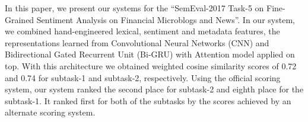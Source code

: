In this paper, we present our systems for the ``SemEval-2017 Task-5 on Fine- Grained Sentiment Analysis on Financial Microblogs and News''. In our system, we combined hand-engineered lexical, sentiment and metadata features, the representations learned from Convolutional Neural Networks (CNN) and Bidirectional Gated Recurrent Unit (Bi-GRU) with Attention model applied on top. With this architecture we obtained weighted cosine similarity scores of 0.72 and 0.74 for subtask-1 and subtask-2, respectively. Using the official scoring system, our system ranked the second place for subtask-2 and eighth place for the subtask-1. It ranked first for both of the subtasks by the scores achieved by an alternate scoring system.
